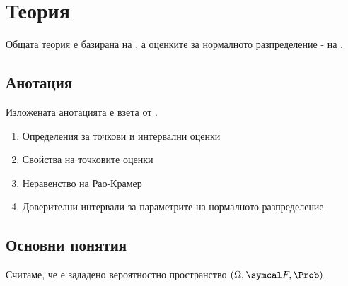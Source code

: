 \documentclass[
  numbers=endperiod,
  headings=standardclasses,
  bibliography=totocnumbered,
]{scrartcl}
\title{\Title{20}}
\subtitle{Точкови и интервални оценки за параметрите на нормалното разпределение.}
\author{Янис Василев}
\date{\Revision{4 юли 2019}}
\begin{document}
\maketitle

\section{Теория}

Общата теория е базирана на \cite{DimitrovYanev}, а оценките за нормалното разпределение - на \cite{ASLectures}.

\subsection{Анотация}

Изложената анотацията е взета от \cite{Syllabus}.

\begin{enumerate}
  \item Определения за точкови и интервални оценки
  \item Свойства на точковите оценки
  \item Неравенство на Рао-Крамер
  \item Доверителни интервали за параметрите на нормалното разпределение
\end{enumerate}

\subsection{Основни понятия}

Считаме, че е зададено вероятностно пространство \( (\Omega, \F, \Prob) \).
\end{document}
